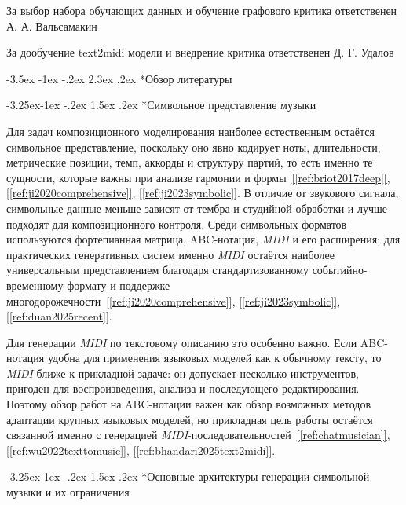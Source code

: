 \documentclass[a4paper,12pt]{extarticle}
\makeatletter
\newcommand{\sourcecite}[1]{\hyperref[#1]{[\ref*{#1}]}}
\renewcommand\section{\@startsection{section}{1}{\z@}%
  {-3.5ex \@plus -1ex \@minus -.2ex}%
  {2.3ex \@plus.2ex}%
  {\normalfont\Large\bfseries\Needspace{8\baselineskip}}}
\renewcommand\subsection{\@startsection{subsection}{2}{\z@}%
  {-3.25ex\@plus -1ex \@minus -.2ex}%
  {1.5ex \@plus .2ex}%
  {\normalfont\large\bfseries\Needspace{6\baselineskip}}}
\makeatother
\begin{document}
За выбор набора обучающих данных и обучение графового критика ответственен А. А. Вальсамакин

За дообучение text2midi модели и внедрение критика ответственен Д. Г. Удалов

\section*{Обзор литературы}

\subsection*{Символьное представление музыки}

Для задач композиционного моделирования наиболее естественным остаётся символьное представление, поскольку оно явно кодирует ноты, длительности, метрические позиции, темп, аккорды и структуру партий, то есть именно те сущности, которые важны при анализе гармонии и формы~\sourcecite{ref:briot2017deep}, \sourcecite{ref:ji2020comprehensive}, \sourcecite{ref:ji2023symbolic}. В отличие от звукового сигнала, символьные данные меньше зависят от тембра и студийной обработки и лучше подходят для композиционного контроля. Среди символьных форматов используются фортепианная матрица, ABC-нотация, \textit{MIDI} и его расширения; для практических генеративных систем именно \textit{MIDI} остаётся наиболее универсальным представлением благодаря стандартизованному событийно-временному формату и поддержке многодорожечности~\sourcecite{ref:ji2020comprehensive}, \sourcecite{ref:ji2023symbolic}, \sourcecite{ref:duan2025recent}.

Для генерации \textit{MIDI} по текстовому описанию это особенно важно. Если ABC-нотация удобна для применения языковых моделей как к обычному тексту, то \textit{MIDI} ближе к прикладной задаче: он допускает несколько инструментов, пригоден для воспроизведения, анализа и последующего редактирования. Поэтому обзор работ на ABC-нотации важен как обзор возможных методов адаптации крупных языковых моделей, но прикладная цель работы остаётся связанной именно с генерацией \textit{MIDI}-последовательностей~\sourcecite{ref:chatmusician}, \sourcecite{ref:wu2022texttomusic}, \sourcecite{ref:bhandari2025text2midi}.

\subsection*{Основные архитектуры генерации символьной музыки и их ограничения}
\end{document}

